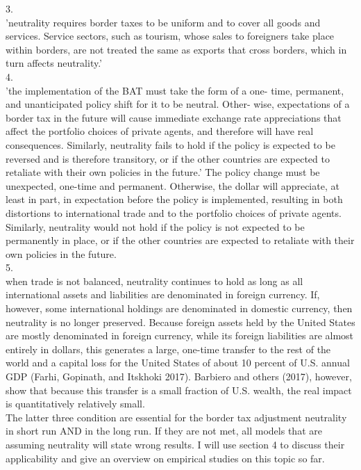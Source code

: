 3. \\ 'neutrality requires border taxes to be uniform and to cover all goods and services. Service sectors, such as tourism, whose sales to foreigners take place within borders, are not treated the same as exports that cross borders, which in turn affects neutrality.' \\
4. \\ 'the implementation of the BAT must take the form of a one- time, permanent, and unanticipated policy shift for it to be neutral. Other- wise, expectations of a border tax in the future will cause immediate exchange rate appreciations that affect the portfolio choices of private agents, and therefore will have real consequences. Similarly, neutrality fails to hold if the policy is expected to be reversed and is therefore transitory, or if the other countries are expected to retaliate with their own policies in the future.' 
The policy change must be unexpected, one-time and permanent. Otherwise, the dollar will appreciate, at least in part, in expectation before the policy is implemented, resulting in both distortions to international trade and to the portfolio choices of private agents. Similarly, neutrality would not hold if the policy is not expected to be permanently in place, or if the other countries are expected to retaliate with their own policies in the future.\\
5. \\ when trade is not balanced, neutrality continues to hold as long as all international assets and liabilities are denominated in foreign currency. If, however, some international holdings are denominated in domestic currency, then neutrality is no longer preserved. Because foreign assets held by the United States are mostly denominated in foreign currency, while its foreign liabilities are almost entirely in dollars, this generates a large, one-time transfer to the rest of the world and a capital loss for the United States of about 10 percent of U.S. annual GDP (Farhi, Gopinath, and Itskhoki 2017). Barbiero and others (2017), however, show that because this transfer is a small fraction of U.S. wealth, the real impact is quantitatively relatively small. \\
The latter three condition are essential for the border tax adjustment neutrality in short run AND in the long run. If they are not met, all models that are assuming neutrality will state wrong results. I will use section 4 to discuss their applicability and give an overview on empirical studies on this topic so far. \\

